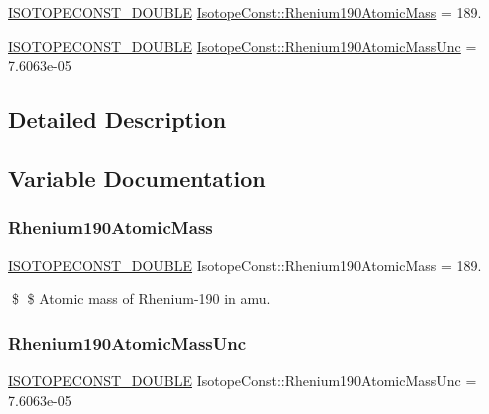 \begin{DoxyCompactItemize}
\item 
\mbox{\hyperlink{group___isotope_const-_macros_ga8f45a7272ce02c0b4c65c44636ed719a}{I\+S\+O\+T\+O\+P\+E\+C\+O\+N\+S\+T\+\_\+\+D\+O\+U\+B\+LE}} \mbox{\hyperlink{group___isotope_const-_rhenium-_re190_ga96f7b920e85abdaa38ad9d8ede05856a}{Isotope\+Const\+::\+Rhenium190\+Atomic\+Mass}} = 189.
\item 
\mbox{\hyperlink{group___isotope_const-_macros_ga8f45a7272ce02c0b4c65c44636ed719a}{I\+S\+O\+T\+O\+P\+E\+C\+O\+N\+S\+T\+\_\+\+D\+O\+U\+B\+LE}} \mbox{\hyperlink{group___isotope_const-_rhenium-_re190_ga292a6e640c7526e04a5a18f6923cf878}{Isotope\+Const\+::\+Rhenium190\+Atomic\+Mass\+Unc}} = 7.\+6063e-\/05
\end{DoxyCompactItemize}


\subsection{Detailed Description}


\subsection{Variable Documentation}
\mbox{\label{group___isotope_const-_rhenium-_re190_ga96f7b920e85abdaa38ad9d8ede05856a}} 
\subsubsection{\texorpdfstring{Rhenium190\+Atomic\+Mass}{Rhenium190AtomicMass}}
{\footnotesize\ttfamily \mbox{\hyperlink{group___isotope_const-_macros_ga8f45a7272ce02c0b4c65c44636ed719a}{I\+S\+O\+T\+O\+P\+E\+C\+O\+N\+S\+T\+\_\+\+D\+O\+U\+B\+LE}} Isotope\+Const\+::\+Rhenium190\+Atomic\+Mass = 189.}

\$ \$ Atomic mass of Rhenium-\/190 in amu. \mbox{\label{group___isotope_const-_rhenium-_re190_ga292a6e640c7526e04a5a18f6923cf878}} 
\subsubsection{\texorpdfstring{Rhenium190\+Atomic\+Mass\+Unc}{Rhenium190AtomicMassUnc}}
{\footnotesize\ttfamily \mbox{\hyperlink{group___isotope_const-_macros_ga8f45a7272ce02c0b4c65c44636ed719a}{I\+S\+O\+T\+O\+P\+E\+C\+O\+N\+S\+T\+\_\+\+D\+O\+U\+B\+LE}} Isotope\+Const\+::\+Rhenium190\+Atomic\+Mass\+Unc = 7.\+6063e-\/05}

